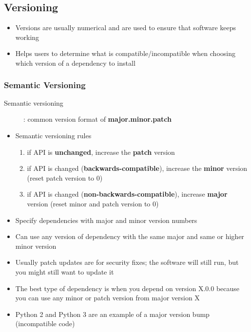 \documentclass[letterpaper,12pt]{article}
\begin{document}
\subsection{Versioning}
\begin{itemize}
 \item Versions are usually numerical and are used to ensure that software keeps working
 \item Helps users to determine what is compatible/incompatible when choosing which version of a dependency to install
\end{itemize}

\subsubsection{Semantic Versioning}

\begin{description}
 \item[Semantic versioning]: common version format of \textbf{major.minor.patch}
\end{description}

\begin{itemize}
 \item Semantic versioning rules
       \begin{enumerate}
        \item if API is \textbf{unchanged}, increase the \textbf{patch} version
        \item if API is changed (\textbf{backwards-compatible}), increase the \textbf{minor} version (reset patch version to 0)
        \item if API is changed (\textbf{non-backwards-compatible}), increase \textbf{major} version (reset minor and patch version to 0)
       \end{enumerate}
 \item Specify dependencies with major and minor version numbers
 \item Can use any version of dependency with the same major and same or higher minor version
 \item Usually patch updates are for security fixes; the software will still run, but you might still want to update it
 \item The best type of dependency is when you depend on version X.0.0 because you can use any minor or patch version from major version X
 \item Python 2 and Python 3 are an example of a major version bump (incompatible code)
\end{itemize}
\end{document}
